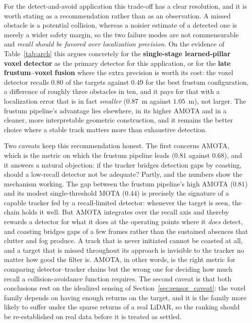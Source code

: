 For the detect-and-avoid application this trade-off has a clear resolution, and it
is worth stating as a recommendation rather than as an observation. A missed
obstacle is a potential collision, whereas a noisier estimate of a detected one is
merely a wider safety margin, so the two failure modes are not commensurable and
\emph{recall should be favored over localization precision}. On the evidence of
Table~\ref{tab:arch} this argues concretely for the \textbf{single-stage
learned-pillar voxel detector} as the primary detector for this application, or
for the \textbf{late frustum--voxel fusion} where the extra precision is worth its
cost: the voxel detector recalls $0.80$ of the targets against $0.49$ for the best
frustum configuration, a difference of roughly three obstacles in ten, and it pays
for that with a localization error that is in fact \emph{smaller}
($0.87$~m against $1.05$~m), not larger. The frustum pipeline's advantage lies
elsewhere, in its higher AMOTA and in a cleaner, more interpretable geometric
construction, and it remains the better choice where a stable track matters more
than exhaustive detection.

Two caveats keep this recommendation honest. The first concerns AMOTA, which is
the metric on which the frustum pipeline leads ($0.81$ against $0.68$), and it
answers a natural objection: if the tracker bridges detection gaps by coasting,
should a low-recall detector not be adequate? Partly, and the numbers show the
mechanism working. The gap between the frustum pipeline's high AMOTA ($0.81$) and
its modest single-threshold MOTA ($0.44$) is precisely the signature of a capable
tracker fed by a recall-limited detector: whenever the target is seen, the chain
holds it well. But AMOTA integrates over the recall axis and thereby rewards a
detector for what it does at the operating points where it \emph{does} detect,
and coasting bridges gaps of a few frames rather than the sustained absences that
clutter and fog produce. A track that is never initiated cannot be coasted at all,
and a target that is missed throughout its approach is invisible to the tracker no
matter how good the filter is. AMOTA, in other words, is the right metric for
comparing detector--tracker chains but the wrong one for deciding how much recall
a collision-avoidance function requires. The second caveat is that both
conclusions rest on the idealized sensing of Section~\ref{sec:sensor_caveat}: the
voxel family depends on having enough returns on the target, and it is the
family more likely to suffer under the sparse returns of a real LiDAR, so the
ranking should be re-established on real data before it is treated as settled.

